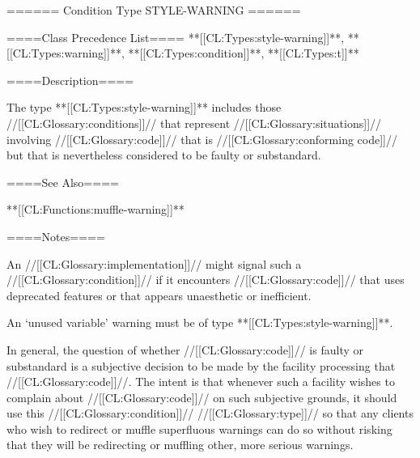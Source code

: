 ====== Condition Type STYLE-WARNING ======

====Class Precedence List==== **[[CL:Types:style-warning]]**, **[[CL:Types:warning]]**, **[[CL:Types:condition]]**, **[[CL:Types:t]]**

====Description====

The type **[[CL:Types:style-warning]]** includes those //[[CL:Glossary:conditions]]// that represent //[[CL:Glossary:situations]]// involving //[[CL:Glossary:code]]// that is //[[CL:Glossary:conforming code]]// but that is nevertheless considered to be faulty or substandard.

====See Also====

**[[CL:Functions:muffle-warning]]**

====Notes====

An //[[CL:Glossary:implementation]]// might signal such a //[[CL:Glossary:condition]]// if it encounters //[[CL:Glossary:code]]// that uses deprecated features or that appears unaesthetic or inefficient.

An `unused variable' warning must be of type **[[CL:Types:style-warning]]**.

In general, the question of whether //[[CL:Glossary:code]]// is faulty or substandard is a subjective decision to be made by the facility processing that //[[CL:Glossary:code]]//. The intent is that whenever such a facility wishes to complain about //[[CL:Glossary:code]]// on such subjective grounds, it should use this //[[CL:Glossary:condition]]// //[[CL:Glossary:type]]// so that any clients who wish to redirect or muffle superfluous warnings can do so without risking that they will be redirecting or muffling other, more serious warnings.

